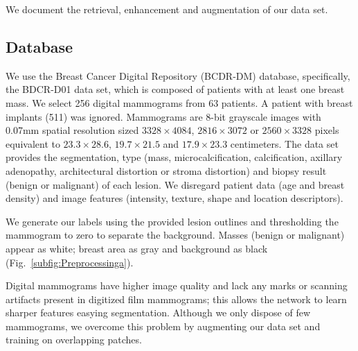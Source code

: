 We document the retrieval, enhancement and augmentation of our data set.

\subsection{Database}
We use the Breast Cancer Digital Repository (BCDR-DM) database, specifically, the BDCR-D01 data set, which is composed of patients with at least one breast mass.
We select 256 digital mammograms from 63 patients.
A patient with breast implants (511) was ignored.
Mammograms are 8-bit grayscale images with 0.07mm spatial resolution sized $3328\times 4084$, $2816\times 3072$ or $2560 \times 3328$ pixels equivalent to $23.3 \times 28.6$, $19.7 \times 21.5$ and $17.9 \times 23.3$ centimeters.
The data set provides the segmentation, type (mass, microcalcification, calcification, axillary adenopathy, architectural distortion or stroma distortion) and biopsy result (benign or malignant) of each lesion.
We disregard patient data (age and breast density) and image features (intensity, texture, shape and location descriptors).

We generate our labels using the provided lesion outlines and thresholding the mammogram to zero to separate the background.
Masses (benign or malignant) appear as white; breast area as gray and background as black (Fig.~\ref{subfig:Preprocessinga}).

Digital mammograms have higher image quality and lack any marks or scanning artifacts present in digitized film mammograms; this allows the network to learn sharper features easying segmentation.
Although we only dispose of few mammograms, we overcome this problem by augmenting our data set and training on overlapping patches.

